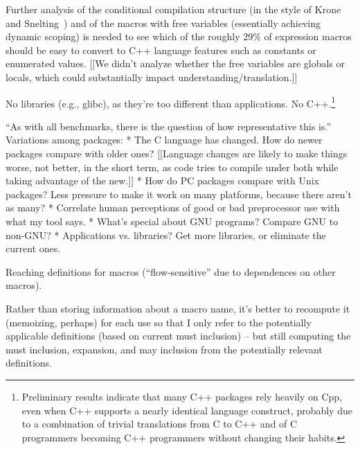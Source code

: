 \documentclass[10pt]{article}
\newcommand{\pkg}[1]{\textsf{#1}}
\begin{document}
Further analysis of the conditional
compilation structure (in the style of Krone and Snelting~\cite{Krone94})
and of the macros with free variables (essentially achieving dynamic
scoping) is needed to see which of the roughly 29\% of expression macros
should be easy to convert to C++ language features such as constants or
enumerated values.
  [[We didn't analyze whether the free variables are globals or locals,
          which could substantially impact understanding/translation.]]


No libraries (e.g., \pkg{glibc}), as they're too different than applications.
No C++.\footnote{Preliminary results indicate that many
  C++ packages rely heavily on Cpp, even when C++ supports a nearly
  identical language construct, probably due to a combination of trivial
  translations from C to C++ and of C programmers becoming C++ programmers
  without changing their habits.}

``As with all benchmarks, there is the question of how representative this is.''
Variations among packages:
 * The C language has changed.  How do newer packages compare with older ones?
   [[Language changes are likely to make things worse, not better, in the
   short term, as code tries to compile under both while taking advantage
   of the new.]]
 * How do PC packages compare with Unix packages?  Less pressure to make it
   work on many platforms, because there aren't as many?
 * Correlate human perceptions of good or bad preprocessor use with what my
   tool says.
 * What's special about GNU programs?  Compare GNU to non-GNU?
 * Applications vs. libraries?  Get more libraries, or eliminate the current
   ones.




          
Reaching definitions for macros (``flow-sensitive'' due to
dependences on other macros).

Rather than storing information about a macro name, it's better to
recompute it (memoizing, perhaps) for each use so that I only refer to the
potentially applicable definitions (based on current must inclusion) -- but
still computing the must inclusion, expansion, and may inclusion from the
potentially relevant definitions.  



{\small }
\end{document}
